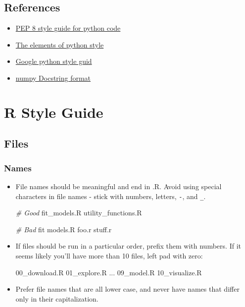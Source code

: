 \documentclass[
]{book}
\newenvironment{Shaded}{\begin{snugshade}}{\end{snugshade}}
\newcommand{\CommentTok}[1]{\textcolor[rgb]{0.56,0.35,0.01}{\textit{#1}}}
\newcommand{\DecValTok}[1]{\textcolor[rgb]{0.00,0.00,0.81}{#1}}
\newcommand{\NormalTok}[1]{#1}
\providecommand{\tightlist}{%
  \setlength{\itemsep}{0pt}\setlength{\parskip}{0pt}}
\begin{document}
\hypertarget{references-1}{%
\section{References}\label{references-1}}

\begin{itemize}
\tightlist
\item
  \href{https://www.python.org/dev/peps/pep-0008/}{PEP 8 style guide for python code}
\item
  \href{https://github.com/amontalenti/elements-of-python-style}{The elements of python style}
\item
  \href{https://google.github.io/styleguide/pyguide.html}{Google python style guid}
\item
  \href{https://numpydoc.readthedocs.io/en/latest/format.html}{numpy Docstring format}
\end{itemize}

\hypertarget{r-style-guide}{%
\chapter{R Style Guide}\label{r-style-guide}}

\hypertarget{files}{%
\section{Files}\label{files}}

\hypertarget{names}{%
\subsection{Names}\label{names}}

\begin{itemize}
\item
  File names should be meaningful and end in .R. Avoid using special
  characters in file names - stick with numbers, letters, \texttt{-}, and \texttt{\_}.

\begin{Shaded}
\begin{Highlighting}[]
\CommentTok{# Good}
\NormalTok{fit_models.R}
\NormalTok{utility_functions.R}

\CommentTok{# Bad}
\NormalTok{fit models.R}
\NormalTok{foo.r}
\NormalTok{stuff.r}
\end{Highlighting}
\end{Shaded}
\item
  If files should be run in a particular order, prefix them with numbers. If
  it seems likely you'll have more than 10 files, left pad with zero:

\begin{Shaded}
\begin{Highlighting}[]
\DecValTok{00}\NormalTok{_download.R}
\DecValTok{01}\NormalTok{_explore.R}
\NormalTok{...}
\DecValTok{09}\NormalTok{_model.R}
\DecValTok{10}\NormalTok{_visualize.R}
\end{Highlighting}
\end{Shaded}
\item
  Prefer file names that are all lower case, and never have names that differ
  only in their capitalization.
\end{itemize}
\end{document}
